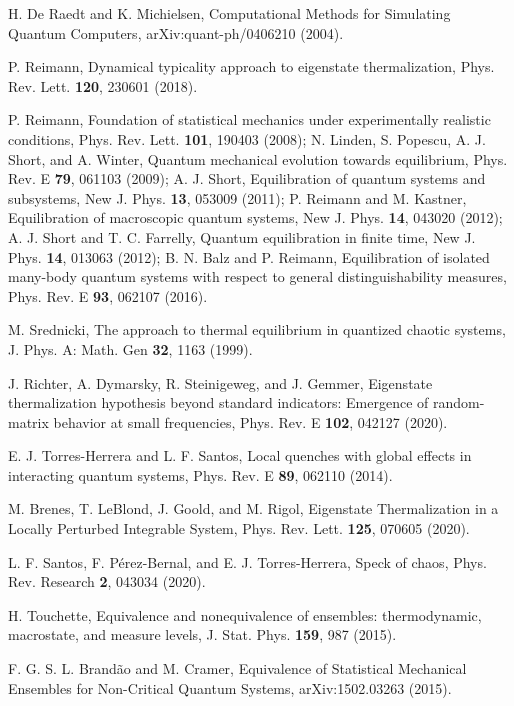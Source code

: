 \documentclass[twocolumn,aps,prb,floatfix,superscriptaddress]{revtex4-2}
\newcommand{\<}{\left\langle}	%
\renewcommand{\>}{\right\rangle}	%
\begin{document}
\begin{thebibliography}{70}
H. De Raedt and K. Michielsen, Computational Methods for Simulating Quantum Computers, arXiv:quant-ph/0406210 (2004).

P. Reimann,
Dynamical typicality approach to eigenstate thermalization,
Phys. Rev. Lett. {\bf 120}, 230601 (2018).

P. Reimann, 
Foundation of statistical mechanics under 
experimentally realistic conditions,
Phys. Rev. Lett. {\bf 101}, 190403  (2008);
N. Linden, S. Popescu, A. J. Short, and A. Winter, 
Quantum mechanical evolution towards equilibrium,
Phys. Rev.  E {\bf 79}, 061103 (2009);
A. J. Short, 
Equilibration of quantum systems and subsystems,
New J. Phys. {\bf 13}, 053009  (2011);
P. Reimann and M. Kastner, 
Equilibration of macroscopic quantum systems,
New J. Phys. {\bf 14}, 043020 (2012);
A. J. Short and T. C. Farrelly,
Quantum equilibration in finite time,
New J. Phys. {\bf 14}, 013063 (2012);
B. N. Balz and P. Reimann, 
Equilibration of isolated many-body quantum systems with 
respect to general distinguishability measures, 
Phys. Rev. E {\bf 93}, 062107 (2016).

M. Srednicki, 
The approach to thermal equilibrium in quantized chaotic systems,
J. Phys. A: Math. Gen {\bf 32}, 1163 (1999).

J. Richter, A. Dymarsky, R. Steinigeweg, and J. Gemmer,
Eigenstate thermalization hypothesis beyond standard indicators: 
Emergence of random-matrix behavior at small frequencies,
Phys. Rev. E {\bf 102}, 042127 (2020).

E. J. Torres-Herrera and L. F. Santos,
Local quenches with global effects in interacting quantum systems,
Phys. Rev. E {\bf 89}, 062110 (2014).

M. Brenes, T. LeBlond, J. Goold, and M. Rigol,
Eigenstate Thermalization in a Locally Perturbed Integrable System,
Phys. Rev. Lett. {\bf 125}, 070605 (2020).

L. F. Santos, F. P\'erez-Bernal, and E. J. Torres-Herrera,
Speck of chaos,
Phys. Rev. Research {\bf 2}, 043034 (2020).

H. Touchette,
Equivalence and nonequivalence of ensembles: thermodynamic, macrostate, and measure levels,
J. Stat. Phys. {\bf 159}, 987 (2015).

F. G. S. L. Brand\~{a}o and M. Cramer,
Equivalence of Statistical Mechanical Ensembles for Non-Critical Quantum Systems,
arXiv:1502.03263 (2015).


\end{thebibliography}
\end{document}
